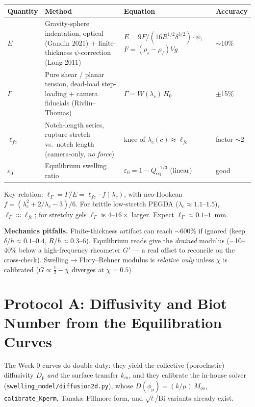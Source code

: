 \documentclass[12pt,letterpaper]{article}
\newcommand{\Gfrac}{\Gamma}
\newcommand{\Emod}{E}
\newcommand{\lG}{\ell_{\Gfrac}}          %
\newcommand{\Dp}{D_{\mathrm{p}}}
\newcommand{\chiFH}{\chi}
\newcommand{\phip}{\phi_{\mathrm{p}}}
\begin{document}
\begin{center}\small
\begin{tabular}{@{}p{2.4cm}p{6.4cm}p{4.6cm}p{1.6cm}@{}}
\toprule
Quantity & Method & Equation & Accuracy \\
\midrule
$\Emod$ & Gravity-sphere indentation, optical (Gandin 2021) $+$ finite-thickness
$\psi$-correction (Long 2011) & $\Emod = 9F/(16R^{1/2}\delta^{3/2})\cdot\psi$,
$F=(\rho_s-\rho_f)Vg$ & $\sim$10\% \\
$\Gfrac$ & Pure shear / planar tension, dead-load step-loading $+$ camera
fiducials (Rivlin--Thomas) & $\Gfrac = W(\lambda_c)\,H_0$ & $\pm$15\% \\
$\ell_{fc}$ & Notch-length series, rupture stretch vs.\ notch length
(camera-only, \emph{no force}) & knee of $\lambda_c(c)\approx \ell_{fc}$ &
factor $\sim$2 \\
$\varepsilon_0$ & Equilibrium swelling ratio & $\varepsilon_0 = 1-Q_{\mathrm{eq}}^{-1/3}$ (linear) & good \\
\bottomrule
\end{tabular}
\end{center}

\noindent Key relation: $\lG=\Gfrac/\Emod = \ell_{fc}\cdot f(\lambda_c)$, with
neo-Hookean $f=(\lambda_c^2+2/\lambda_c-3)/6$. For brittle low-stretch PEGDA
($\lambda_c\!\approx\!1.1$--$1.5$), $\lG\approx\ell_{fc}$; for stretchy gels $\lG$
is $4$--$16\times$ larger. Expect $\lG\approx0.1$--$1$~mm.

\begin{cautionbox}
\textbf{Mechanics pitfalls.} Finite-thickness artifact can reach $\sim$600\% if
ignored (keep $\delta/h\!\approx\!0.1$--$0.4$, $R/h\!\approx\!0.3$--$6$).
Equilibrium reads give the \emph{drained} modulus ($\sim$10--40\% below a
high-frequency rheometer $G'$ --- a real offset to reconcile on the cross-check).
Swelling$\to$Flory--Rehner modulus is \emph{relative only} unless $\chiFH$ is
calibrated ($G\propto \tfrac12-\chiFH$ diverges at $\chiFH=0.5$).
\end{cautionbox}

\section{Protocol A: Diffusivity and Biot Number from the Equilibration Curves}
\label{sec:diff}
The Week-0 curves do double duty: they yield the collective (poroelastic)
diffusivity $\Dp$ \emph{and} the surface transfer $k_m$, and they calibrate the
in-house solver (\texttt{swelling\_model/diffusion2d.py}), whose
$D(\phip)=(k/\mu)\,M_{os}$, \texttt{calibrate\_Kperm}, Tanaka--Fillmore form, and
$\sqrt{t}$/Bi variants already exist.
\end{document}
